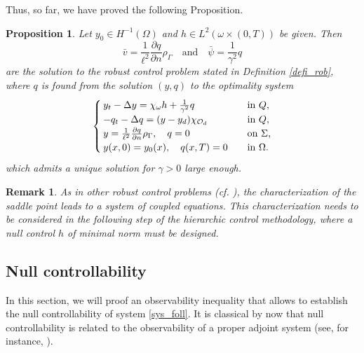 \documentclass[preprint,10pt]{article}
\newtheorem{proposition}[theorem]{Proposition}
\newtheorem{remark}[theorem]{Remark}
\numberwithin{equation}{section}
\numberwithin{theorem}{section}
\def\csbd{\rho_{\Gamma}}
\begin{document}
{Thus, so far, we have proved the following Proposition.
%
\begin{proposition}
Let $y_0\in H^{-1}(\Omega)$ and $h\in L^2(\omega\times(0,T))$ be given. Then
%
\begin{equation*}
\bar v=\frac{1}{\ell^2}\frac{\partial q}{\partial n}\csbd \quad\text{and}\quad \bar \psi=\frac{1}{\gamma^2}q
\end{equation*}
% 
are the solution to the robust control problem stated in Definition \ref{defi_rob}, where $q$ is found from the solution $(y,q)$ to the optimality system 
%
\begin{equation}\label{sys_foll}
\begin{cases}
y_t-\Delta y= \chi_\omega h+\frac{1}{\gamma^2}q \quad&\textnormal{in }Q, \\
-q_t-\Delta q=(y-y_d)\chi_{\mathcal O_d} \quad& \textnormal{in }Q, \\
y=\frac{1}{\ell^2}\frac{\partial q}{\partial n}\csbd, \quad q=0 \quad &\textnormal{on $\Sigma$,} \\
y(x,0)=y_0(x), \quad q(x,T)=0 \quad &\textnormal{in $\Omega$}.
\end{cases}
\end{equation}
%
which admits a unique solution for $\gamma>0$ large enough. 
%
\end{proposition}

\begin{remark}
As in other robust control problems (cf. \cite{aziz,temam_nonlinear}), the characterization of the saddle point leads to a system of coupled equations. This characterization needs to be considered in the following step of the hierarchic control methodology, where a null control $h$ of minimal norm must be designed.
\end{remark}

\subsection{Null controllability}\label{sec_null_1}

In this section, we will proof an observability inequality that allows to establish the null controllability of system \eqref{sys_foll}. It is classical by now that null controllability is related to the observability of a proper adjoint system (see, for instance, \cite{cara_guerrero,zab}). 

}
\end{document}
